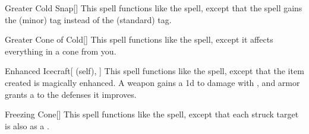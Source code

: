 \lowercase{\hypertarget{spell:Greater Cold Snap}{}}\label{spell:Greater Cold Snap}
\begin{freeability}[\nth{3}]{\hypertarget{spell:Greater Cold Snap}{Greater Cold Snap}}[]
This spell functions like the  spell, except that the spell gains the  (minor) tag instead of the  (standard) tag.
\end{freeability}
\vspace{0.25em}



\lowercase{\hypertarget{spell:Greater Cone of Cold}{}}\label{spell:Greater Cone of Cold}
\begin{freeability}[\nth{3}]{\hypertarget{spell:Greater Cone of Cold}{Greater Cone of Cold}}[]
This spell functions like the  spell, except it affects everything in a \arealarge cone from you.
\end{freeability}
\vspace{0.25em}



\lowercase{\hypertarget{spell:Enhanced Icecraft}{}}\label{spell:Enhanced Icecraft}
\begin{attuneability}[\nth{4}]{\hypertarget{spell:Enhanced Icecraft}{Enhanced Icecraft}}[ (self), ]
This spell functions like the  spell, except that the item created is magically enhanced.
A weapon gains a \plus1d  to damage with , and armor grants a   to the defenses it improves.
\end{attuneability}
\vspace{0.25em}



\lowercase{\hypertarget{spell:Freezing Cone}{}}\label{spell:Freezing Cone}
\begin{freeability}[\nth{4}]{\hypertarget{spell:Freezing Cone}{Freezing Cone}}[]
This spell functions like the  spell, except that each struck target is also  as a .
\end{freeability}
\vspace{0.25em}



